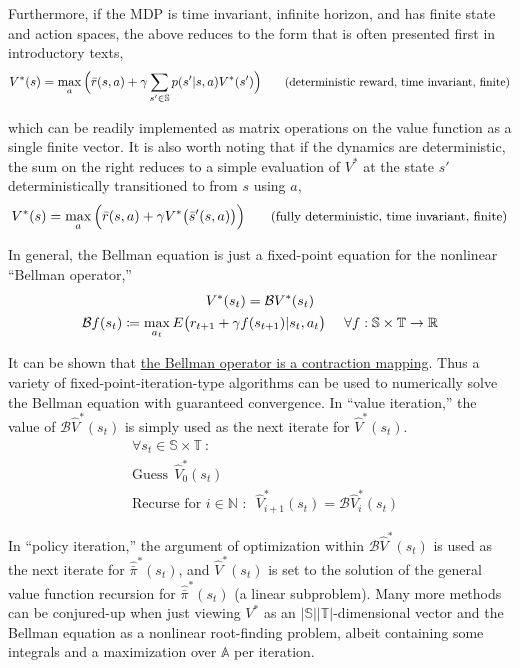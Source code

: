 Furthermore, if the MDP is time invariant, infinite horizon, and has finite state and action spaces, the above reduces to the form that is often presented first in introductory texts,
\begin{equation*}
V^*(s) = \max_{a} \Big{(} \bar{r}(s, a) + \gamma \sum_{s' \in \mathbb{S}} p(s'|s,a) V^*(s') \Big{)} \small{\tag{deterministic reward, time invariant, finite}}
\end{equation*}

which can be readily implemented as matrix operations on the value function as a single finite vector. It is also worth noting that if the dynamics are deterministic, the sum on the right reduces to a simple evaluation of $V^*$ at the state $s'$ deterministically transitioned to from $s$ using $a$,
\begin{equation*}
V^*(s) = \max_{a} \Big{(} \bar{r}(s, a) + \gamma V^*\big{(}\bar{s}'(s, a)\big{)} \Big{)} \small{\tag{fully deterministic, time invariant, finite}}
\end{equation*}

In general, the Bellman equation is just a fixed-point equation for the nonlinear ``Bellman operator,''
\begin{gather*}
V^*(s_t) = \mathcal{B}V^*(s_t)\\
\mathcal{B} f(s_t) \coloneqq \max_{a_t} E\big{(}r_{t+1} + \gamma f(s_{t+1}) | s_t, a_t\big{)}\ \ \ \ \forall f : \mathbb{S} \times \mathbb{T} \to \mathbb{R}
\end{gather*}

It can be shown that \href{https://people.eecs.berkeley.edu/~ananth/223Spr07/ee223_spr07_lec19.pdf}{the Bellman operator is a contraction mapping}. Thus a variety of fixed-point-iteration-type algorithms can be used to numerically solve the Bellman equation with guaranteed convergence. In ``value iteration,'' the value of $\mathcal{B}\hat{V}^*(s_t)$ is simply used as the next iterate for $\hat{V}^*(s_t)$.
\begin{align*}
&\forall s_t \in {\mathbb{S} \times \mathbb{T}}\ :\\
&\text{Guess}\ \ \hat{V}^*_0(s_t)\\
&\text{Recurse for $i \in \mathbb{N}$\ :}\ \ \ \hat{V}^*_{i+1}(s_t) = \mathcal{B}\hat{V}^*_i(s_t)
\end{align*}

In ``policy iteration,'' the argument of optimization within $\mathcal{B}\hat{V}^*(s_t)$ is used as the next iterate for $\hat{\bar{\pi}}^*(s_t)$, and $\hat{V}^*(s_t)$ is set to the solution of the general value function recursion for $\hat{\bar{\pi}}^*(s_t)$ (a linear subproblem). Many more methods can be conjured-up when just viewing $V^*$ as an $|\mathbb{S}||\mathbb{T}|$-dimensional vector and the Bellman equation as a nonlinear root-finding problem, albeit containing some integrals and a maximization over $\mathbb{A}$ per iteration.\\


